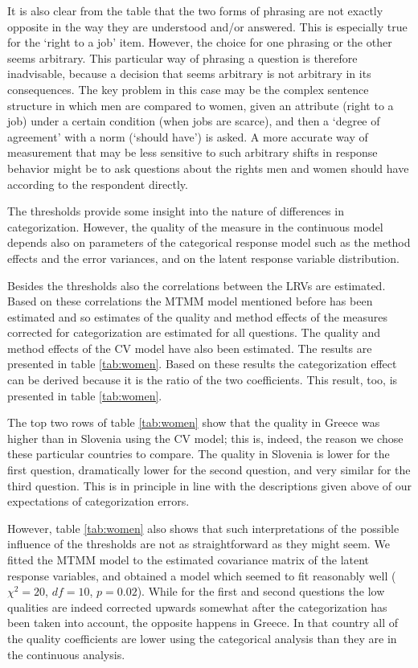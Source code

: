 \documentclass[a4paper,12pt]{article}
\begin{document}
It is also clear from the table that the two forms of phrasing are not exactly opposite in the way they are understood and/or answered. This is especially true for the `right to a job' item. However, the choice for one phrasing or the other seems arbitrary. This particular way of phrasing a question is therefore inadvisable, because a decision  that seems arbitrary is not arbitrary in its consequences. The key problem in this case may be the complex sentence structure in which men are compared to women, given an attribute (right to a job) under a certain condition (when jobs are scarce), and then a `degree of agreement' with a norm (`should have') is asked. A more accurate way of measurement that may be less sensitive to such arbitrary shifts in response behavior might be to ask questions about the rights men and women should have according to the respondent directly.

The thresholds provide some insight into the nature of differences in categorization. However, the quality of the measure in the continuous model depends also on parameters of the categorical response model such as the method effects and the error variances, and on the latent response variable distribution. 


Besides the thresholds also the correlations between the LRVs are estimated. Based on these correlations the MTMM model mentioned before has been estimated and so estimates of the quality and method effects of the measures corrected for categorization are estimated for all questions. The quality and method effects of the CV model have also been estimated. The results are presented in table \ref{tab:women}. Based on these results the categorization effect can be derived because it is the ratio of the two coefficients. This result, too, is presented in table \ref{tab:women}.

The top two rows of table \ref{tab:women} show that the quality in Greece was higher than in Slovenia using the CV model; this is, indeed, the reason we chose these particular countries to compare. The quality in Slovenia is lower for the first question, dramatically lower for the second question, and very similar for the third question. This is in principle in line with the descriptions given above of our expectations of categorization errors.

However, table \ref{tab:women} also shows that such interpretations of the possible influence of the thresholds are not as straightforward as they might seem. We fitted the MTMM model to the estimated covariance matrix of the latent response variables, and obtained a model which seemed to fit reasonably well ($\chi^2 = 20$, $df=10$, $p=0.02$). While for the first and second questions the low qualities are indeed corrected upwards somewhat after the categorization has been taken into account, the opposite happens in Greece. In that country all of the quality coefficients are lower using the categorical analysis than they are in the continuous analysis.  
\end{document}
